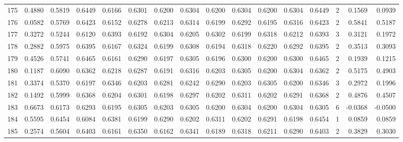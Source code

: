 \begin{tabular}{lrrrrrrrrrrrrrrr}
175 &      0.4880 &  0.5819 &  0.6449 &  0.6166 &  0.6301 &  0.6200 &  0.6304 &  0.6200 &  0.6304 &  0.6200 &   0.6304 &     0.6449 &      2 &                    0.1569 &                     0.0939 \\
176 &      0.0582 &  0.5769 &  0.6423 &  0.6152 &  0.6278 &  0.6213 &  0.6314 &  0.6199 &  0.6292 &  0.6195 &   0.6316 &     0.6423 &      2 &                    0.5841 &                     0.5187 \\
177 &      0.3272 &  0.5244 &  0.6120 &  0.6393 &  0.6192 &  0.6304 &  0.6205 &  0.6302 &  0.6199 &  0.6318 &   0.6212 &     0.6393 &      3 &                    0.3121 &                     0.1972 \\
178 &      0.2882 &  0.5975 &  0.6395 &  0.6167 &  0.6324 &  0.6199 &  0.6308 &  0.6194 &  0.6318 &  0.6220 &   0.6292 &     0.6395 &      2 &                    0.3513 &                     0.3093 \\
179 &      0.4526 &  0.5741 &  0.6465 &  0.6161 &  0.6290 &  0.6197 &  0.6305 &  0.6196 &  0.6300 &  0.6200 &   0.6300 &     0.6465 &      2 &                    0.1939 &                     0.1215 \\
180 &      0.1187 &  0.6090 &  0.6362 &  0.6218 &  0.6287 &  0.6191 &  0.6316 &  0.6203 &  0.6305 &  0.6200 &   0.6304 &     0.6362 &      2 &                    0.5175 &                     0.4903 \\
181 &      0.3374 &  0.5370 &  0.6197 &  0.6346 &  0.6203 &  0.6281 &  0.6242 &  0.6290 &  0.6203 &  0.6305 &   0.6200 &     0.6346 &      3 &                    0.2972 &                     0.1996 \\
182 &      0.1492 &  0.5999 &  0.6368 &  0.6204 &  0.6301 &  0.6198 &  0.6297 &  0.6202 &  0.6311 &  0.6202 &   0.6291 &     0.6368 &      2 &                    0.4876 &                     0.4507 \\
183 &      0.6673 &  0.6173 &  0.6293 &  0.6195 &  0.6305 &  0.6203 &  0.6305 &  0.6200 &  0.6304 &  0.6200 &   0.6304 &     0.6305 &      6 &                   -0.0368 &                    -0.0500 \\
184 &      0.5595 &  0.6454 &  0.6084 &  0.6381 &  0.6199 &  0.6290 &  0.6202 &  0.6311 &  0.6202 &  0.6291 &   0.6198 &     0.6454 &      1 &                    0.0859 &                     0.0859 \\
185 &      0.2574 &  0.5604 &  0.6403 &  0.6161 &  0.6350 &  0.6162 &  0.6341 &  0.6189 &  0.6318 &  0.6211 &   0.6290 &     0.6403 &      2 &                    0.3829 &                     0.3030 \\

\end{tabular}
